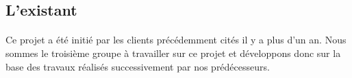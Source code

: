 \documentclass{article}
\begin{document}
\subsection{L'existant}
\paragraph{}
Ce projet a été initié par les clients précédemment cités il y a plus d'un an. Nous sommes le troisième groupe à travailler sur ce projet et développons donc sur la base des travaux réalisés successivement par nos prédécesseurs.
\end{document}
